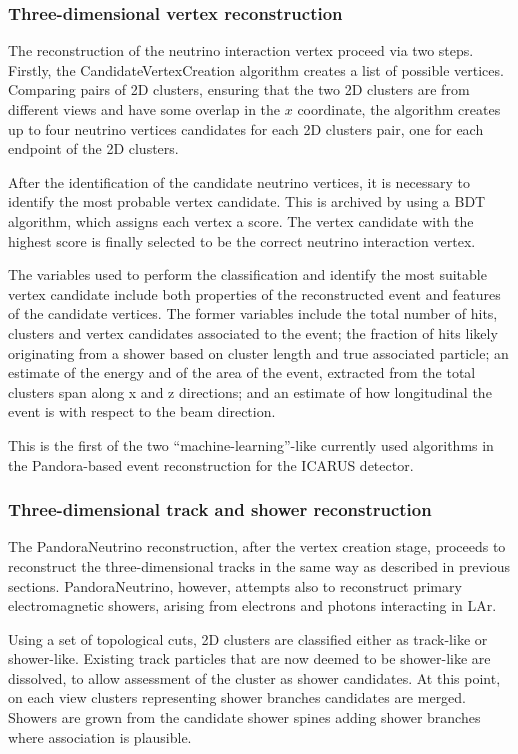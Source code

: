 \subsubsection{Three-dimensional vertex reconstruction}

The reconstruction of the neutrino interaction vertex proceed via two steps. Firstly, the CandidateVertexCreation algorithm creates a list of possible vertices. Comparing pairs of 2D clusters, ensuring that the two 2D clusters are from different views and have some overlap in the $x$ coordinate, the algorithm creates up to four neutrino vertices candidates for each 2D clusters pair, one for each endpoint of the 2D clusters. 

After the identification of the candidate neutrino vertices, it is necessary to identify the most probable vertex candidate. This is archived by using a BDT algorithm, which assigns each vertex a score. The vertex candidate with the highest score is finally selected to be the correct neutrino interaction vertex. 

The variables used to perform the classification and identify the most suitable vertex candidate include both properties of the reconstructed event and features of the candidate vertices. The former variables include the total number of hits, clusters and vertex candidates associated to the event; the fraction of hits likely originating from a shower based on cluster length and true associated particle; an estimate of the energy and of the area of the event, extracted from the total clusters span along x and z directions; and an estimate of how longitudinal the event is with respect to the beam direction. 

This is the first of the two ``machine-learning''-like currently used algorithms in the Pandora-based event reconstruction for the ICARUS detector. 

\subsubsection{Three-dimensional track and shower reconstruction}

The PandoraNeutrino reconstruction, after the vertex creation stage, proceeds to reconstruct the three-dimensional tracks in the same way as described in previous sections. PandoraNeutrino, however, attempts also to reconstruct primary electromagnetic showers, arising from electrons and photons interacting in LAr. 

Using a set of topological cuts, 2D clusters are classified either as track-like or shower-like. Existing track particles that are now deemed to be shower-like are dissolved, to allow assessment of the cluster as shower candidates. At this point, on each view clusters representing shower branches candidates are merged. Showers are grown from the candidate shower spines adding shower branches where association is plausible. 

